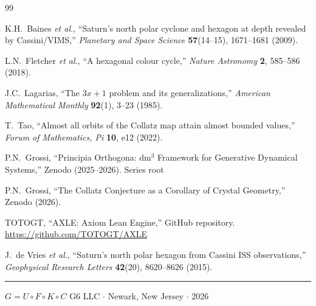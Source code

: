 \documentclass[11pt, a4paper]{article}
\theoremstyle{definition}
\begin{document}
\begin{thebibliography}{99}

K.H.\ Baines \textit{et al.},
``Saturn's north polar cyclone and hexagon at depth revealed by Cassini/VIMS,''
\textit{Planetary and Space Science} \textbf{57}(14--15), 1671--1681 (2009).

L.N.\ Fletcher \textit{et al.},
``A hexagonal colour cycle,''
\textit{Nature Astronomy} \textbf{2}, 585--586 (2018).

J.C.\ Lagarias,
``The $3x+1$ problem and its generalizations,''
\textit{American Mathematical Monthly} \textbf{92}(1), 3--23 (1985).

T.\ Tao,
``Almost all orbits of the Collatz map attain almost bounded values,''
\textit{Forum of Mathematics, Pi} \textbf{10}, e12 (2022).

P.N.\ Grossi,
``Principia Orthogona: dm$^3$ Framework for Generative Dynamical Systems,''
Zenodo (2025--2026).
Series root 

P.N.\ Grossi,
``The Collatz Conjecture as a Corollary of Crystal Geometry,''
Zenodo (2026).

TOTOGT,
``AXLE: Axiom Lean Engine,''
GitHub repository.
\url{https://github.com/TOTOGT/AXLE}

J.\ de Vries \textit{et al.},
``Saturn's north polar hexagon from Cassini ISS observations,''
\textit{Geophysical Research Letters} \textbf{42}(20), 8620--8626 (2015).

\end{thebibliography}

\vfill
\hrule
\smallskip
{\small $G = U \circ F \circ K \circ C$ \quad G6 LLC $\cdot$ Newark, New Jersey $\cdot$ 2026}
\end{document}
